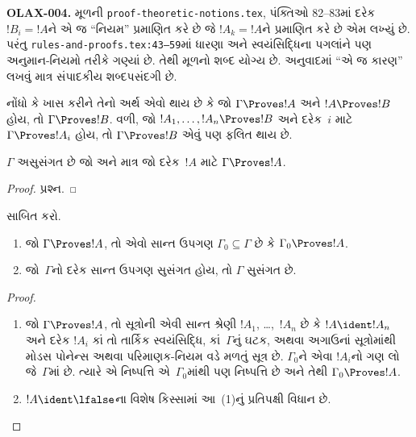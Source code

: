 \begin{editorial}
\textbf{OLAX-004.} મૂળની \texttt{proof-theoretic-notions.tex}, પંક્તિઓ 82--83માં દરેક $!B_i=!A$ને એ જ ``નિયમ'' પ્રમાણિત કરે છે જે $!A_k=!A$ને પ્રમાણિત કરે છે એમ લખ્યું છે. પરંતુ \texttt{rules-and-proofs.tex:43--59}માં ધારણા અને સ્વયંસિદ્ધિના પગલાંને પણ અનુમાન-નિયમો તરીકે ગણ્યાં છે. તેથી મૂળનો શબ્દ યોગ્ય છે. અનુવાદમાં ``એ જ કારણ'' લખવું માત્ર સંપાદકીય શબ્દપસંદગી છે.
\end{editorial}


નોંધો કે ખાસ કરીને તેનો અર્થ એવો થાય છે કે જો $\Gamma \Proves !A$ અને
$!A \Proves !B$ હોય, તો $\Gamma \Proves !B$. વળી, જો
$!A_1, \dots, !A_n \Proves !B$ અને દરેક~$i$ માટે
$\Gamma \Proves !A_i$ હોય, તો $\Gamma \Proves !B$ એવું પણ ફલિત થાય છે.

\begin{prop}
$\Gamma$ અસુસંગત છે જો અને માત્ર જો દરેક~$!A$ માટે
$\Gamma \Proves !A$.
\end{prop}

\begin{proof}
પ્રશ્ન.
\end{proof}


\begin{prob}
 સાબિત કરો.
\end{prob}




\begin{prop}[સઘનતા]
  \begin{enumerate}
  \item જો $\Gamma \Proves !A$, તો એવો સાન્ત ઉપગણ $\Gamma_0
    \subseteq \Gamma$ છે કે $\Gamma_0 \Proves !A$.
  \item જો~$\Gamma$નો દરેક સાન્ત ઉપગણ સુસંગત હોય, તો $\Gamma$
    સુસંગત છે.
  \end{enumerate}
\end{prop}

\begin{proof}
  \begin{enumerate}
    \item જો $\Gamma \Proves !A$, તો સૂત્રોની એવી સાન્ત શ્રેણી
      $!A_1$, \dots,~$!A_n$ છે કે $!A \ident !A_n$ અને દરેક $!A_i$
      કાં તો તાર્કિક સ્વયંસિદ્ધિ, કાં~$\Gamma$નું ઘટક, અથવા
      અગાઉનાં સૂત્રોમાંથી મોડસ પોનેન્સ અથવા પરિમાણક-નિયમ વડે મળતું સૂત્ર છે.
      $\Gamma_0$ને એવા $!A_i$નો ગણ લો જે~$\Gamma$માં છે. ત્યારે એ
      નિષ્પત્તિ એ~$\Gamma_0$માંથી પણ નિષ્પત્તિ છે અને તેથી
      $\Gamma_0 \Proves !A$.
    \item $!A \ident \lfalse$ના વિશેષ કિસ્સામાં આ~(1)નું
      પ્રતિપક્ષી વિધાન છે.
\end{enumerate}
\end{proof}

